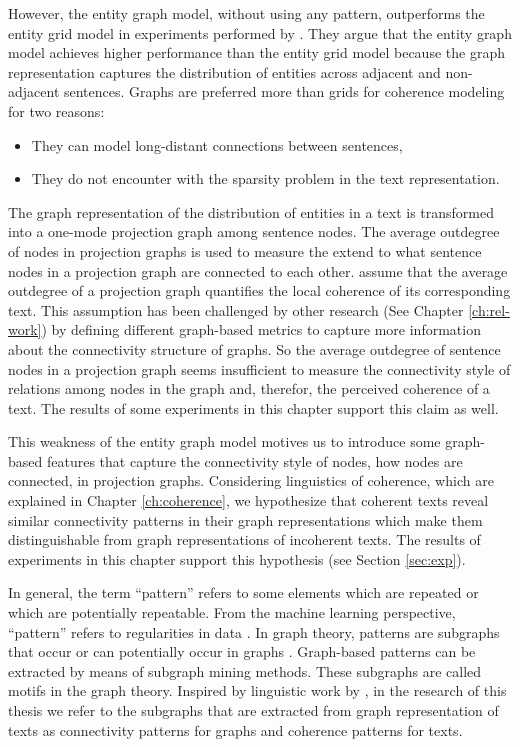 However, the entity graph model, without using any pattern, outperforms the entity grid model in experiments performed by . 
They argue that the entity graph model achieves higher performance than the entity grid model because the graph representation captures the distribution of entities across adjacent and non-adjacent sentences. 
Graphs are preferred more than grids for coherence modeling for two reasons:

\begin{itemize}

	\item They can model long-distant connections between sentences,

	\item They do not encounter with the sparsity problem in the text representation. 

\end{itemize}

The graph representation of the distribution of entities in a text is transformed into a \mbox{one-mode} projection graph among sentence nodes. 
The average outdegree of nodes in projection graphs is used to measure the extend to what sentence nodes in a projection graph are connected to each other. 
 assume that the average outdegree of a projection graph quantifies the local coherence of its corresponding text. 
This assumption has been challenged by other research (See Chapter \ref{ch:rel-work}) by defining different graph-based metrics to capture more information about the connectivity structure of graphs. 
So the average outdegree of sentence nodes in a projection graph seems insufficient to measure the connectivity style of relations among nodes in the graph and, therefor, the perceived coherence of a text. 
The results of some experiments in this chapter support this claim as well. 

This weakness of the entity graph model motives us to introduce some graph-based features that capture the connectivity style of nodes, how nodes are connected, in projection graphs. 
Considering linguistics of coherence, which are explained in Chapter \ref{ch:coherence}, we hypothesize that  coherent texts reveal similar connectivity patterns in their graph representations which make them distinguishable from graph representations of incoherent texts. 
The results of experiments in this chapter support this hypothesis (see Section \ref{sec:exp}). 

In general, the term ``pattern'' refers to some elements which are repeated or which are potentially repeatable. 
From the machine learning perspective, ``pattern'' refers to regularities in data \cite{bishop06}.     
In graph theory, patterns are subgraphs that occur or can potentially occur in graphs \cite{newmanmark10}. 
Graph-based patterns can be extracted by means of subgraph mining methods. 
These subgraphs are called motifs in the graph theory. 
Inspired by linguistic work by , in the research of this thesis we refer to the  subgraphs that are extracted from graph representation of texts as connectivity patterns for graphs and coherence patterns for texts.  


